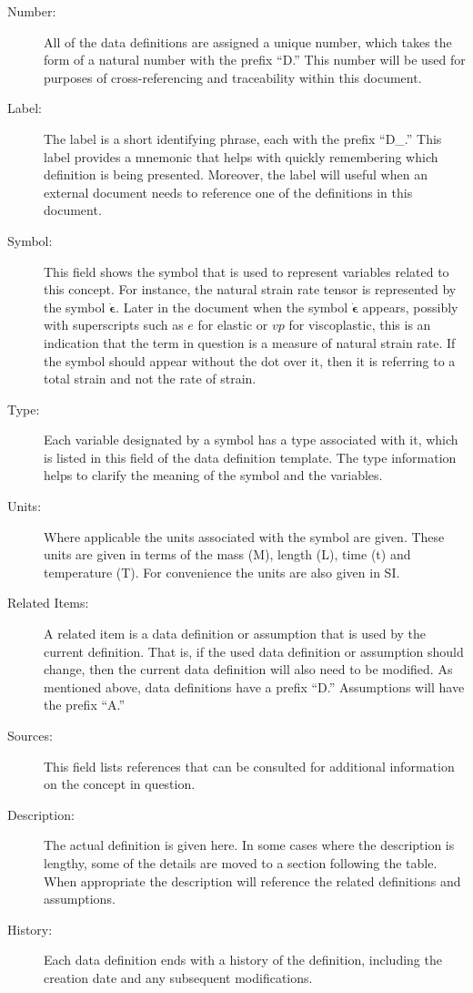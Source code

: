 \documentclass{article}
\begin{document}
\begin{description}

\item [Number:] All of the data definitions are assigned a unique number, which
  takes the form of a natural number with the prefix ``D.''  This number will be
  used for purposes of cross-referencing and traceability within this document.
\item [Label:] The label is a short identifying phrase, each with the prefix
  ``D\_.''  This label provides a mnemonic that helps with quickly remembering
  which definition is being presented.  Moreover, the label will useful when an
  external document needs to reference one of the definitions in this document.
\item [Symbol:] This field shows the symbol that is used to represent variables
  related to this concept.  For instance, the natural strain rate tensor is
  represented by the symbol $\dot{\bm{\epsilon}}$.  Later in the document when
  the symbol $\dot{\bm{\epsilon}}$ appears, possibly with superscripts such as
  $e$ for elastic or $vp$ for viscoplastic, this is an indication that the term
  in question is a measure of natural strain rate.  If the symbol should appear
  without the dot over it, then it is referring to a total strain and not the
  rate of strain.
\item [Type:] Each variable designated by a symbol has a type associated with
  it, which is listed in this field of the data definition template.  The type
  information helps to clarify the meaning of the symbol and the variables.
\item [Units:] Where applicable the units associated with the symbol are given.
  These units are given in terms of the mass (M), length (L), time (t) and
  temperature (T).  For convenience the units are also given in SI.
\item [Related Items:] A related item is a data definition or assumption that is
  used by the current definition.  That is, if the used data definition or
  assumption should change, then the current data definition will also need to
  be modified.  As mentioned above, data definitions have a prefix ``D.''
  Assumptions will have the prefix ``A.''
\item [Sources:] This field lists references that can be consulted for
  additional information on the concept in question.
\item [Description:] The actual definition is given here.  In some cases where
  the description is lengthy, some of the details are moved to a section
  following the table.  When appropriate the description will reference the
  related definitions and assumptions.
\item [History:] Each data definition ends with a history of the definition,
  including the creation date and any subsequent modifications.

\end{description}
\end{document}
